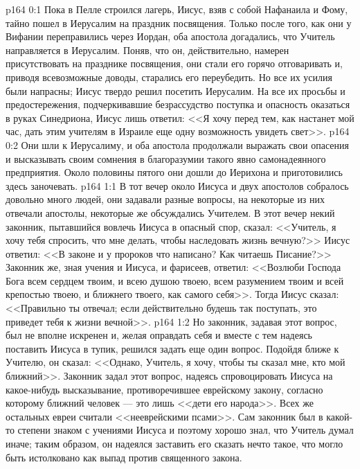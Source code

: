 \vs p164 0:1 Пока в Пелле строился лагерь, Иисус, взяв с собой Нафанаила и Фому, тайно пошел в Иерусалим на праздник посвящения. Только после того, как они у Вифании переправились через Иордан, оба апостола догадались, что Учитель направляется в Иерусалим. Поняв, что он, действительно, намерен присутствовать на празднике посвящения, они стали его горячо отговаривать и, приводя всевозможные доводы, старались его переубедить. Но все их усилия были напрасны; Иисус твердо решил посетить Иерусалим. На все их просьбы и предостережения, подчеркивавшие безрассудство поступка и опасность оказаться в руках Синедриона, Иисус лишь ответил: <<Я хочу перед тем, как настанет мой час, дать этим учителям в Израиле еще одну возможность увидеть свет>>.
\vs p164 0:2 Они шли к Иерусалиму, и оба апостола продолжали выражать свои опасения и высказывать своим сомнения в благоразумии такого явно самонадеянного предприятия. Около половины пятого они дошли до Иерихона и приготовились здесь заночевать.
\vs p164 1:1 В тот вечер около Иисуса и двух апостолов собралось довольно много людей, они задавали разные вопросы, на некоторые из них отвечали апостолы, некоторые же обсуждались Учителем. В этот вечер некий законник, пытавшийся вовлечь Иисуса в опасный спор, сказал: <<Учитель, я хочу тебя спросить, что мне делать, чтобы наследовать жизнь вечную?>> Иисус ответил: <<В законе и у пророков что написано? Как читаешь Писание?>> Законник же, зная учения и Иисуса, и фарисеев, ответил: <<Возлюби Господа Бога всем сердцем твоим, и всею душою твоею, всем разумением твоим и всей крепостью твоею, и ближнего твоего, как самого себя>>. Тогда Иисус сказал: <<Правильно ты отвечал; если действительно будешь так поступать, это приведет тебя к жизни вечной>>.
\vs p164 1:2 Но законник, задавая этот вопрос, был не вполне искренен и, желая оправдать себя и вместе с тем надеясь поставить Иисуса в тупик, решился задать еще один вопрос. Подойдя ближе к Учителю, он сказал: <<Однако, Учитель, я хочу, чтобы ты сказал мне, кто мой ближний>>. Законник задал этот вопрос, надеясь спровоцировать Иисуса на какое\hyp{}нибудь высказывание, противоречившее еврейскому закону, согласно которому ближний человек --- это лишь <<дети его народа>>. Всех же остальных евреи считали <<нееврейскими псами>>. Сам законник был в какой\hyp{}то степени знаком с учениями Иисуса и поэтому хорошо знал, что Учитель думал иначе; таким образом, он надеялся заставить его сказать нечто такое, что могло быть истолковано как выпад против священного закона.

